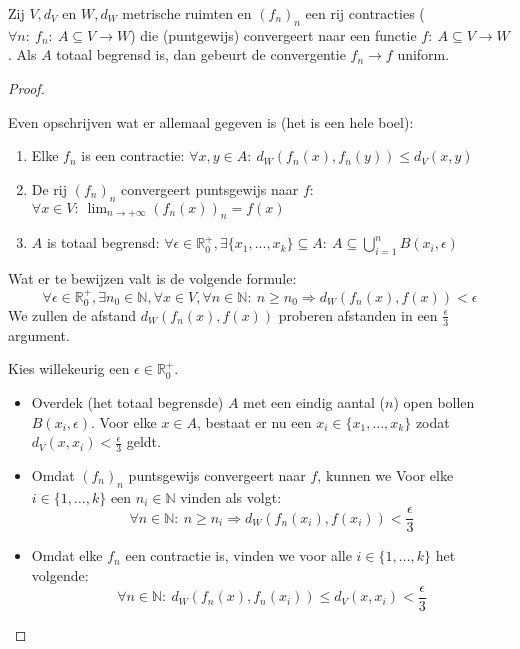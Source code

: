 \documentclass[main.tex]{subfiles}
\begin{document}
\begin{st}
  Zij $V,d_{V}$ en $W,d_{W}$ metrische ruimten en $(f_{n})_{n}$ een rij contracties ($\forall n:\ f_{n}:\ A \subseteq V \rightarrow W$) die (puntgewijs) convergeert naar een functie $f:\ A \subseteq V \rightarrow W$.
  Als $A$ totaal begrensd is, dan gebeurt de convergentie $f_{n} \rightarrow f$ uniform.

  \begin{proof}
    \noindent
    \begin{klad}
      Even opschrijven wat er allemaal gegeven is (het is een hele boel):
      \begin{enumerate}
      \item Elke $f_{n}$ is een contractie: $\forall x,y\in A:\ d_{W}(f_{n}(x),f_{n}(y)) \le d_{V}(x,y)$
      \item De rij $(f_{n})_{n}$ convergeert puntsgewijs naar $f$: $\forall x\in V:\ \lim_{n\rightarrow +\infty}(f_{n}(x))_{n} = f(x)$
      \item $A$ is totaal begrensd: $\forall \epsilon\in\mathbb{R}_{0}^{+}, \exists \{x_{1},...,x_{k}\} \subseteq A:\ A \subseteq \bigcup_{i=1}^{n}B(x_{i},\epsilon)$
      \end{enumerate}
      Wat er te bewijzen valt is de volgende formule:
      \[ \forall \epsilon\in\mathbb{R}_{0}^{+}, \exists n_{0}\in \mathbb{N}, \forall x\in V, \forall n\in\mathbb{N}:\ n \ge n_{0} \Rightarrow d_{W}(f_{n}(x),f(x)) < \epsilon \]
      We zullen de afstand $d_{W}(f_{n}(x),f(x))$ proberen afstanden in een $\frac{\epsilon}{3}$ argument.
    \end{klad}
    Kies willekeurig een $\epsilon \in \mathbb{R}_{0}^{+}$.
    \begin{itemize}
    \item Overdek (het totaal begrensde) $A$ met een eindig aantal ($n$) open bollen $B(x_{i},\epsilon)$.
      Voor elke $x\in A$, bestaat er nu een $x_{i}\in \{x_{1},\dotsc,x_{k}\}$ zodat $d_{V}(x,x_{i}) < \frac{\epsilon}{3}$ geldt.
    \item Omdat $(f_{n})_{n}$ puntsgewijs convergeert naar $f$, kunnen we Voor elke $i\in \{1,\dotsc,k\}$ een $n_{i}\in\mathbb{N}$ vinden als volgt:
      \[ \forall n\in \mathbb{N}:\ n\ge n_{i}\Rightarrow d_{W}(f_{n}(x_{i}),f(x_{i})) < \frac{\epsilon}{3} \]
    \item Omdat elke $f_{n}$ een contractie is, vinden we voor alle $i\in\{1,\dotsc,k\}$ het volgende:
      \[ \forall n\in\mathbb{N}:\ d_{W}(f_{n}(x),f_{n}(x_{i})) \le d_{V}(x,x_{i}) < \frac{\epsilon}{3} \]

\end{itemize}
\end{proof}
\end{st}
\end{document}
